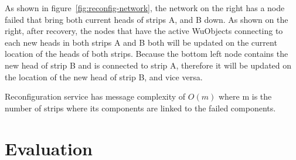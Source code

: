 As shown in figure~\ref{fig:reconfig-network}, the network on the right has
a node failed that bring both current heads of strips A, and B down. As shown
on the right, after recovery, the nodes that have the active WuObjects
connecting to each new heads in both strips A and B both will be updated on the
current location of the heads of both strips. Because the bottom left node
contains the new head of strip B and is connected to strip A, therefore it will
be updated on the location of the new head of strip B, and vice versa.

Reconfiguration service has message complexity of $O(m)$ where m is the
number of strips where its components are linked to the failed components.

 %

\section{Evaluation}

